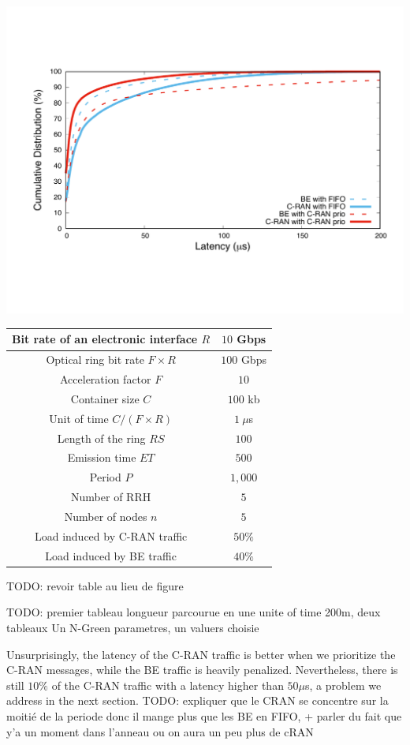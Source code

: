 \documentclass[10pt, conference, letterpaper]{IEEEtran}
\newcommand{\todo}[1]{{\color{red} TODO: {#1}}}
\begin{document}
        \begin{center}
      \includegraphics[scale=0.3]{opport.pdf}

         \label{fig:resultopport}

  \scalebox{0.65}
  {

  \begin{tabular}{|c|c|}
  \hline
  Bit rate of an electronic interface $R$ & $10$ Gbps \tabularnewline
  \hline
  Optical ring bit rate $F\times R$ & $100$ Gbps \tabularnewline
  \hline
    Acceleration factor $F$ & $10$  \tabularnewline
  \hline
  Container size  $C$ & $100$ kb  \tabularnewline
  \hline
  Unit of time $C/(F\times R)$ & $1~\mu$s \tabularnewline
  \hline
  Length of the ring $RS$ & $100$ \tabularnewline
  \hline
  Emission time $ET$ & $500$ \tabularnewline
  \hline
   Period $P$ & $1,000$ \tabularnewline
  \hline
  Number of RRH & $5$  \tabularnewline
  \hline
  Number of nodes $n$ & $5$  \tabularnewline
  \hline
   Load induced by C-RAN traffic & $50\%$  \tabularnewline
  \hline
    Load induced by BE traffic & $40\%$  \tabularnewline
  \hline
  \end{tabular}
  }
\todo{revoir table au lieu de figure}
  \label{fig:params}
      \end{center} \todo{premier tableau longueur parcourue en une unite of time 200m, deux tableaux Un N-Green parametres, un valuers choisie}

Unsurprisingly, the latency of the C-RAN traffic is better when we prioritize the C-RAN messages, while the BE traffic is heavily penalized. Nevertheless, there is still $10\%$ of the C-RAN traffic with a latency higher than $50 \mu$s, a problem we address in the next section. \todo{expliquer que le CRAN se concentre sur la moitié de la periode donc il mange plus que les BE en FIFO, + parler du fait que y'a un moment dans l'anneau ou on aura un peu plus de cRAN}
\end{document}
